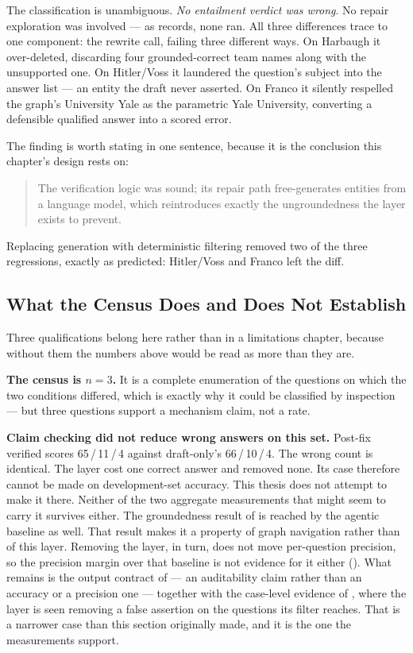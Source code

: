 The classification is unambiguous. \emph{No entailment verdict was wrong}. No
repair exploration was involved --- as  records, none ran.
All three differences trace to one component: the rewrite call, failing three
different ways. On Harbaugh it over-deleted, discarding four grounded-correct
team names along with the unsupported one. On Hitler/Voss it laundered the
question's subject into the answer list --- an entity the draft never asserted.
On Franco it silently respelled the graph's \textsf{University Yale} as the
parametric \textsf{Yale University}, converting a defensible qualified answer
into a scored error.

The finding is worth stating in one sentence, because it is the conclusion this
chapter's design rests on:

\begin{quote}
The verification logic was sound; its repair path free-generates entities from a
language model, which reintroduces exactly the ungroundedness the layer exists
to prevent.
\end{quote}

Replacing generation with deterministic filtering removed two of the three
regressions, exactly as predicted: Hitler/Voss and Franco left the diff.

\subsection*{What the Census Does and Does Not Establish}

Three qualifications belong here rather than in a limitations chapter, because
without them the numbers above would be read as more than they are.

\textbf{The census is $n = 3$.} It is a complete enumeration of the questions on
which the two conditions differed, which is exactly why it could be classified
by inspection --- but three questions support a mechanism claim, not a rate.

\textbf{Claim checking did not reduce wrong answers on this set.} Post-fix
verified scores 65\,/\,11\,/\,4 against draft-only's 66\,/\,10\,/\,4. The wrong
count is identical. The layer cost one correct answer and removed none. Its
case therefore cannot be made on development-set accuracy. This thesis does
not attempt to make it there. Neither of the two aggregate measurements that
might seem to carry it survives  either. The groundedness
result of  is reached by the agentic baseline
as well. That result makes it a property of graph navigation rather than of
this layer. Removing the layer, in turn, does not move per-question precision,
so the precision margin over that baseline is not evidence for it either
(). What remains is the output contract of
 --- an auditability claim rather than an accuracy or
a precision one --- together with the case-level evidence of
, where the layer is seen removing a false
assertion on the questions its filter reaches. That is a narrower case than this
section originally made, and it is the one the measurements support.

